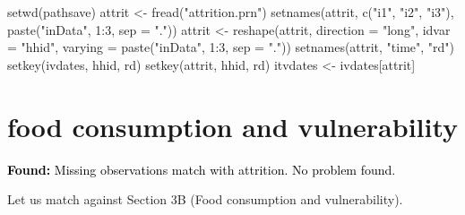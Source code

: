 \begin{Schunk}
\begin{Sinput}
setwd(pathsave)
attrit <- fread("attrition.prn")
setnames(attrit, c("i1", "i2", "i3"), paste("inData", 1:3, sep = "."))
attrit <- reshape(attrit, direction = "long", idvar = "hhid", 
	varying = paste("inData", 1:3, sep = "."))
setnames(attrit, "time", "rd")
setkey(ivdates, hhid, rd)
setkey(attrit, hhid, rd)
itvdates <- ivdates[attrit]
\end{Sinput}
\end{Schunk}
\begin{Schunk}
\end{Schunk}


\section{food consumption and vulnerability}

\textcolor{black}{\textbf{Found:} Missing observations match with attrition. No problem found.}

Let us match against Section 3B (Food consumption and vulnerability).

